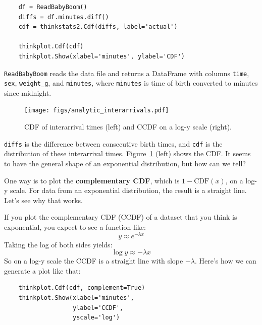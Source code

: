 \documentclass[12pt]{book}
\newcommand{\CDF}{\mathrm{CDF}}
\theoremstyle{exercise}
\begin{document}
\begin{verbatim}
    df = ReadBabyBoom()
    diffs = df.minutes.diff()
    cdf = thinkstats2.Cdf(diffs, label='actual')

    thinkplot.Cdf(cdf)
    thinkplot.Show(xlabel='minutes', ylabel='CDF')
\end{verbatim}

{\tt ReadBabyBoom} reads the data file and returns a DataFrame
with columns {\tt time}, {\tt sex}, \verb"weight_g", and {\tt minutes},
where {\tt minutes} is time of birth converted to minutes since
midnight.%
%

\begin{figure}
\centerline{\texttt{[image: figs/analytic\_interarrivals.pdf]}}
\caption{CDF of interarrival times (left) and CCDF on a log-y scale (right).}%
\label{analytic_interarrival_cdf}
\end{figure}


{\tt diffs} is the difference between consecutive birth times, and
{\tt cdf} is the distribution of these interarrival times.
Figure~\ref{analytic_interarrival_cdf} (left) shows the CDF.  It seems
to have the general shape of an exponential distribution, but how can
we tell?

One way is to plot the {\bf complementary CDF}, which is $1 - \CDF(x)$,
on a log-y scale.  For data from an exponential distribution, the
result is a straight line.  Let's see why that works.%
%
%

If you plot the complementary CDF (CCDF) of a dataset that you think is
exponential, you expect to see a function like:
%
\[ y \approx e^{-\lambda x} \]
%
Taking the log of both sides yields:
%
\[ \log y \approx -\lambda x\]
%
So on a log-y scale the CCDF is a straight line
with slope $-\lambda$.  Here's how we can generate a plot like that:%
%
%
%


\begin{verbatim}
    thinkplot.Cdf(cdf, complement=True)
    thinkplot.Show(xlabel='minutes',
                   ylabel='CCDF',
                   yscale='log')
\end{verbatim}
\end{document}
